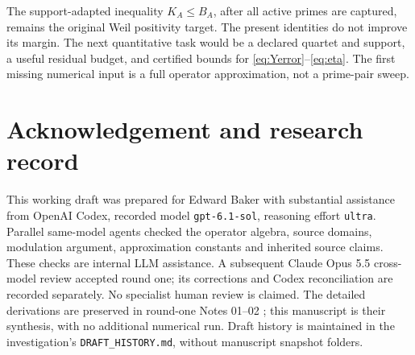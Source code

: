 \documentclass[11pt]{article}
\theoremstyle{remark}
\numberwithin{equation}{section}
\begin{document}
The support-adapted inequality \(K_A\le B_A\), after all active primes
are captured, remains the original Weil positivity target. The present
identities do not improve its margin. The next quantitative task would
be a declared quartet and support, a useful residual budget, and certified
bounds for \eqref{eq:Yerror}--\eqref{eq:eta}. The first missing numerical
input is a full operator approximation, not a prime-pair sweep.

\section*{Acknowledgement and research record}

This working draft was prepared for Edward Baker with substantial
assistance from OpenAI Codex, recorded model \texttt{gpt-6.1-sol},
reasoning effort \texttt{ultra}. Parallel same-model agents checked the
operator algebra, source domains, modulation argument, approximation
constants and inherited source claims. These checks are internal LLM
assistance. A subsequent Claude Opus 5.5
cross-model review accepted round one; its corrections and Codex
reconciliation are recorded separately. No specialist human review is
claimed. The detailed derivations are preserved in round-one Notes
01--02 \cite{note01,note02}; this manuscript is their synthesis, with no
additional numerical run. Draft history is maintained in the investigation's
\texttt{DRAFT\_HISTORY.md}, without manuscript snapshot folders.
\end{document}
